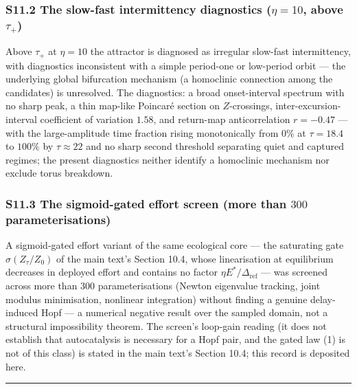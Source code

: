 \documentclass[
  10pt,
  a4paper,
]{article}
\begin{document}
\subsubsection{\texorpdfstring{S11.2 The slow-fast intermittency
diagnostics (\(\eta = 10\), above
\(\tau_+\))}{S11.2 The slow-fast intermittency diagnostics (\textbackslash eta = 10, above \textbackslash tau\_+)}}\label{s11.2-the-slow-fast-intermittency-diagnostics-eta-10-above-tau_}

Above \(\tau_+\) at \(\eta = 10\) the attractor is diagnosed as
irregular slow-fast intermittency, with diagnostics inconsistent with a
simple period-one or low-period orbit --- the underlying global
bifurcation mechanism (a homoclinic connection among the candidates) is
unresolved. The diagnostics: a broad onset-interval spectrum with no
sharp peak, a thin map-like Poincaré section on \(Z\)-crossings,
inter-excursion-interval coefficient of variation \(1.58\), and
return-map anticorrelation \(r = -0.47\) --- with the large-amplitude
time fraction rising monotonically from \(0\%\) at \(\tau = 18.4\) to
\(100\%\) by \(\tau \approx 22\) and no sharp second threshold
separating quiet and captured regimes; the present diagnostics neither
identify a homoclinic mechanism nor exclude torus breakdown.

\subsubsection{\texorpdfstring{S11.3 The sigmoid-gated effort screen
(more than \(300\)
parameterisations)}{S11.3 The sigmoid-gated effort screen (more than 300 parameterisations)}}\label{s11.3-the-sigmoid-gated-effort-screen-more-than-300-parameterisations}

A sigmoid-gated effort variant of the same ecological core --- the
saturating gate \(\sigma(Z_\tau/Z_0)\) of the main text's Section 10.4,
whose linearisation at equilibrium decreases in deployed effort and
contains no factor \(\eta E^*/\Delta_{\mathrm{ref}}\) --- was screened
across more than \(300\) parameterisations (Newton eigenvalue tracking,
joint modulus minimisation, nonlinear integration) without finding a
genuine delay-induced Hopf --- a numerical negative result over the
sampled domain, not a structural impossibility theorem. The screen's
loop-gain reading (it does not establish that autocatalysis is necessary
for a Hopf pair, and the gated law (1) is not of this class) is stated
in the main text's Section 10.4; this record is deposited here.

\begin{center}\rule{0.5\linewidth}{0.5pt}\end{center}
\end{document}
